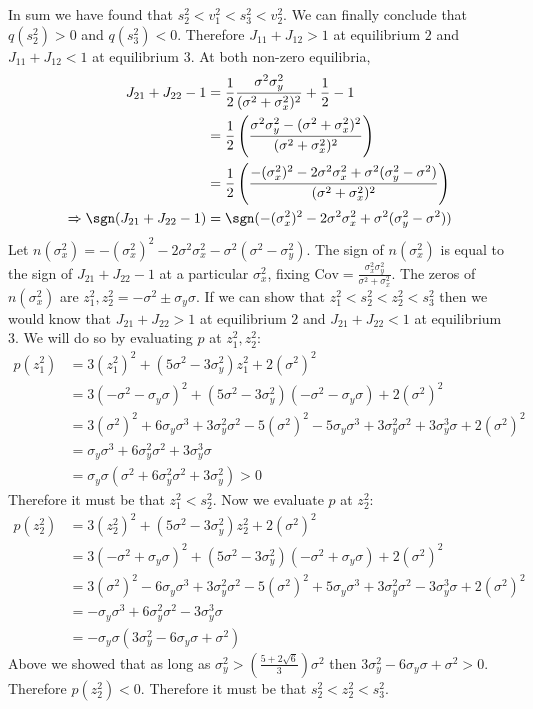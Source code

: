 \documentclass{article}
\newcommand{\Cov}{\text{Cov}}
\begin{document}
\begin{enumerate}
In sum we have found that $s_2^2<v_1^2<s_3^2<v_2^2$. We can finally conclude that $q(s_2^2)> 0$ and $q(s_3^2)< 0$. Therefore $J_{11}+J_{12}> 1$ at equilibrium $2$ and $J_{11}+J_{12}< 1$ at equilibrium $3$. At both non-zero equilibria,
\begin{align*}
J_{21}+J_{22}-1&=\frac{1}{2}\frac{\sigma^2\sigma_y^2}{(\sigma^2+\sigma_x^2)^2}+\frac{1}{2}-1
\\&=\frac{1}{2}\left(\frac{\sigma^2\sigma_y^2-(\sigma^2+\sigma_x^2)^2}{(\sigma^2+\sigma_x^2)^2}\right)
\\&=\frac{1}{2}\left(\frac{-(\sigma_x^2)^2-2\sigma^2\sigma_x^2+\sigma^2(\sigma_y^2-\sigma^2)}{(\sigma^2+\sigma_x^2)^2}\right)
\\ \Rightarrow \sgn(J_{21}+J_{22}-1)&=\sgn(-(\sigma_x^2)^2-2\sigma^2\sigma_x^2+\sigma^2(\sigma_y^2-\sigma^2))
\end{align*}
Let $n(\sigma_x^2)=-(\sigma_x^2)^2-2\sigma^2\sigma_x^2-\sigma^2(\sigma^2-\sigma_y^2)$. The sign of $n(\sigma_x^2)$ is equal to the sign of $J_{21}+J_{22}-1$ at a particular $\sigma_x^2$, fixing $\Cov=\frac{\sigma_x^2\sigma_y^2}{\sigma^2+\sigma_x^2}$. The zeros of $n(\sigma_x^2)$ are $z_1^2,z_2^2=-\sigma^2\pm\sigma_y\sigma$. If we can show that $z_1^2<s_2^2<z_2^2<s_3^2$ then we would know that $J_{21}+J_{22}>1$ at equilibrium $2$ and $J_{21}+J_{22}<1$ at equilibrium $3$. We will do so by evaluating $p$ at $z_1^2,z_2^2$:
\begin{align*}
p(z_1^2)&=3(z_1^2)^2+(5\sigma^2-3\sigma_y^2)z_1^2+2(\sigma^2)^2
\\&=3(-\sigma^2-\sigma_y\sigma)^2+(5\sigma^2-3\sigma_y^2)(-\sigma^2-\sigma_y\sigma)+2(\sigma^2)^2
\\&=3(\sigma^2)^2+6\sigma_y\sigma^3+3\sigma_y^2\sigma^2-5(\sigma^2)^2-5\sigma_y\sigma^3+3\sigma_y^2\sigma^2+3\sigma_y^3\sigma+2(\sigma^2)^2
\\&=\sigma_y\sigma^3+6\sigma_y^2\sigma^2+3\sigma_y^3\sigma
\\&=\sigma_y\sigma(\sigma^2+6\sigma_y^2\sigma^2+3\sigma_y^2)>0
\end{align*}
Therefore it must be that $z_1^2<s_2^2$. Now we evaluate $p$ at $z_2^2$:
\begin{align*}
p(z_2^2)&=3(z_2^2)^2+(5\sigma^2-3\sigma_y^2)z_2^2+2(\sigma^2)^2
\\&=3(-\sigma^2+\sigma_y\sigma)^2+(5\sigma^2-3\sigma_y^2)(-\sigma^2+\sigma_y\sigma)+2(\sigma^2)^2
\\&=3(\sigma^2)^2-6\sigma_y\sigma^3+3\sigma_y^2\sigma^2-5(\sigma^2)^2+5\sigma_y\sigma^3+3\sigma_y^2\sigma^2-3\sigma_y^3\sigma+2(\sigma^2)^2
\\&=-\sigma_y\sigma^3+6\sigma_y^2\sigma^2-3\sigma_y^3\sigma
\\&=-\sigma_y\sigma(3\sigma_y^2-6\sigma_y\sigma+\sigma^2)
\end{align*}
Above we showed that as long as $\sigma_y^2>\left(\frac{5+2\sqrt{6}}{3}\right)\sigma^2$ then $3\sigma_y^2-6\sigma_y\sigma+\sigma^2>0$. Therefore $p(z_2^2)<0$. Therefore it must be that $s_2^2<z_2^2<s_3^2$. 


\end{enumerate}
\end{document}

